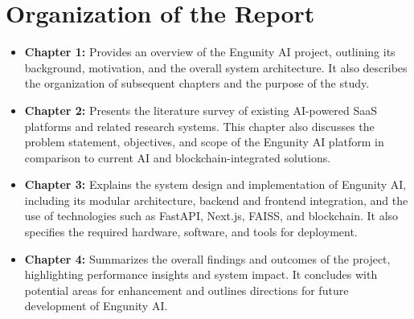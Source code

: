 \section{Organization of the Report}
\begin{itemize}
\item \textbf{Chapter 1:} Provides an overview of the Engunity AI project, outlining its background, motivation, and the overall system architecture. It also describes the organization of subsequent chapters and the purpose of the study.
\item \textbf{Chapter 2:} Presents the literature survey of existing AI-powered SaaS platforms and related research systems. This chapter also discusses the problem statement, objectives, and scope of the Engunity AI platform in comparison to current AI and blockchain-integrated solutions.
\item \textbf{Chapter 3:} Explains the system design and implementation of Engunity AI, including its modular architecture, backend and frontend integration, and the use of technologies such as FastAPI, Next.js, FAISS, and blockchain. It also specifies the required hardware, software, and tools for deployment.
\item \textbf{Chapter 4:} Summarizes the overall findings and outcomes of the project, highlighting performance insights and system impact. It concludes with potential areas for enhancement and outlines directions for future development of Engunity AI.

\cite{langchain2023framework}
\end{itemize}

